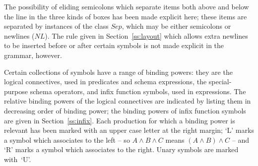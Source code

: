 The possibility of eliding semicolons which separate items both above and
below the line in the three kinds of boxes has been made explicit here;
these items are separated by instances of the class \(Sep\), which may be
either semicolons or newlines (\(NL\)). The rule given in
Section~\ref{ss:layout} which allows extra newlines to be inserted
before or after certain symbols is not made explicit in the grammar,
however.

Certain collections of symbols have a range of binding powers: they
are the logical connectives, used in predicates and schema
expressions, the special-purpose schema operators, and infix function
symbols, used in expressions. The relative binding powers of the
logical connectives are indicated by listing them in decreasing order
of binding power; the binding powers of infix function symbols are
given in Section~\ref{ss:infix}. Each production for which a binding
power is relevant has been marked with an upper case letter at the
right margin; `L' marks a symbol which associates to the left -- so $A
\land B \land C$ means $(A \land B) \land C$ -- and `R' marks a symbol
which associates to the right. Unary symbols are marked with~`U'.

